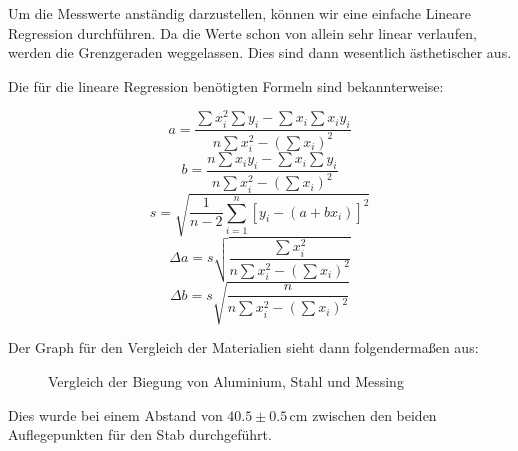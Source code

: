 \documentclass[11pt,a4paper]{article}
\begin{document}
Um die Messwerte anst\"andig darzustellen, k\"onnen wir eine einfache Lineare Regression durchf\"uhren. Da die Werte schon von allein sehr linear verlaufen, werden die Grenzgeraden weggelassen. Dies sind dann wesentlich \"asthetischer aus.

Die f\"ur die lineare Regression ben\"otigten Formeln sind bekannterweise:

\begin{equation}
a=\frac{\sum x_i^2\sum y_i-\sum x_i\sum x_iy_i}{n\sum x_i^2-(\sum x_i)^2}
\end{equation}
\begin{equation}
b=\frac{n\sum x_iy_i-\sum x_i\sum y_i}{n\sum x_i^2-(\sum x_i)^2}
\end{equation}
\begin{equation}
s=\sqrt{\frac{1}{n-2}\sum^n_{i=1}[y_i-(a+bx_i)]^2}
\end{equation}
\begin{equation}
\Delta a=s\sqrt{\frac{\sum x_i^2}{n\sum x_i^2-(\sum x_i)^2}}
\end{equation}
\begin{equation}
\Delta b=s\sqrt{\frac{n}{n\sum x_i^2-(\sum x_i)^2}}
\end{equation}

Der Graph f\"ur den Vergleich der Materialien sieht dann folgenderma\ss en aus:

\begin{figure}[h]
\centering
{}
\renewcommand\thefigure{1}
\caption[Vergleich der Biegung von Aluminium, Stahl und Messing]{Vergleich der Biegung von Aluminium, Stahl und Messing}
\label{Abb:X}
\end{figure}

Dies wurde bei einem Abstand von $40.5\pm0.5$\,cm zwischen den beiden Auflegepunkten f\"ur den Stab durchgef\"uhrt.
\end{document}
